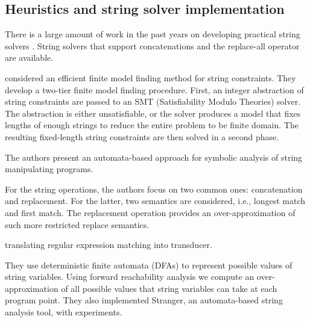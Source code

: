 \subsection*{Heuristics and string solver implementation}

There is a large amount of work in the past years on developing practical string solvers
. String solvers that support concatenations and the replace-all operator are available. \cite{BTV09, TCJ14, YABI14,TCJ16}

\cite{BTV09} considered an efficient finite model finding method for string constraints. They develop a two-tier finite model finding procedure. First, an integer abstraction of string constraints are passed to an SMT (Satisfiability Modulo Theories) solver. The abstraction is either unsatisfiable, or the solver produces a model that fixes lengths of enough strings to reduce the entire problem to be finite domain. The resulting fixed-length string constraints are then solved in a second phase. 



\cite{YABI14} %
The authors present an automata-based approach for symbolic analysis of string manipulating programs. 

For the string operations, the authors focus on two common ones: concatenation and replacement. For the latter, two semantics are considered, i.e., longest match and first match. The replacement operation provides an over-approximation of such more restricted replace semantics. 

\cite{SMV12} translating regular expression matching into transducer. 

They use deterministic finite automata (DFAs) to represent possible values of string variables. Using forward reachability analysis we compute an over-approximation of all possible values that string variables can take at each program point. They also implemented Stranger, an automata-based string analysis tool, with experiments. 


